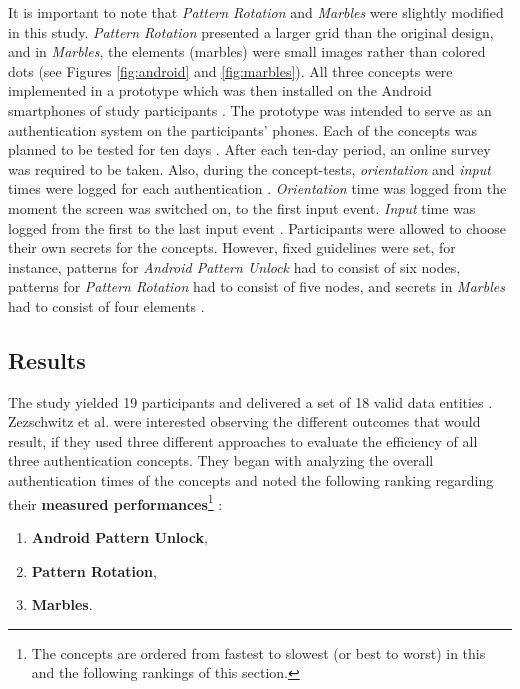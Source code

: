 It is important to note that \textit{Pattern Rotation} and \textit{Marbles} \cite{Marbles} were slightly modified in this study. \textit{Pattern Rotation} presented a larger grid than the original design, and in \textit{Marbles}, the elements (marbles) were small images rather than colored dots (see Figures \ref{fig:android} and \ref{fig:marbles}). All three concepts were implemented in a prototype which was then installed on the Android smartphones of study participants \cite{Zezschwitz}. The prototype was intended to serve as an authentication system on the participants' phones. Each of the concepts was planned to be tested for ten days \cite{Zezschwitz}. After each ten-day period, an online survey was required to be taken. Also, during the concept-tests, \textit{orientation} and \textit{input} times were logged for each authentication \cite{Zezschwitz}. \textit{Orientation} time was logged from the moment the screen was switched on, to the first input event. \textit{Input} time was logged from the first to the last input event \cite{Zezschwitz}. Participants were allowed to choose their own secrets for the concepts. However, fixed guidelines were set, for instance, patterns for \textit{Android Pattern Unlock} had to consist of six nodes, patterns for \textit{Pattern Rotation} had to consist of five nodes, and secrets in \textit{Marbles} had to consist of four elements \cite{Zezschwitz}.

\subsection{Results}

The study yielded 19 participants and delivered a set of 18 valid data entities \cite{Zezschwitz}. Zezschwitz et al. \cite{Zezschwitz} were interested observing the different outcomes that would result, if they used three different approaches to evaluate the efficiency of all three authentication concepts. They began with analyzing the overall authentication times of the concepts and noted the following ranking regarding their \textbf{measured performances}\footnote{The concepts are ordered from fastest to slowest (or best to worst) in this and the following rankings of this section.} \cite{Zezschwitz}:

\begin{enumerate}
    \item \textbf{Android Pattern Unlock},
    \item \textbf{Pattern Rotation},
    \item \textbf{Marbles}.
\end{enumerate} 

